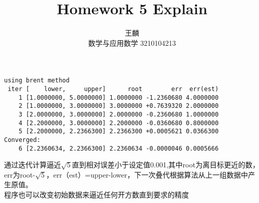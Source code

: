 \documentclass{ctexart}
\title{Homework 5 Explain}
\author{王麟 \\ 数学与应用数学 3210104213}
\begin{document}
\maketitle

\begin{verbatim}
using brent method
 iter [    lower,     upper]      root        err  err(est)
    1 [1.0000000, 5.0000000] 1.0000000 -1.2360680 4.0000000
    2 [1.0000000, 3.0000000] 3.0000000 +0.7639320 2.0000000
    3 [2.0000000, 3.0000000] 2.0000000 -0.2360680 1.0000000
    4 [2.2000000, 3.0000000] 2.2000000 -0.0360680 0.8000000
    5 [2.2000000, 2.2366300] 2.2366300 +0.0005621 0.0366300
Converged:
    6 [2.2360634, 2.2366300] 2.2360634 -0.0000046 0.0005666
\end{verbatim}

通过迭代计算逼近$\sqrt{5}$直到相对误差小于设定值0.001,其中root为离目标更近的数，err为root-$\sqrt{5}$，err（est）=upper-lower，下一次叠代根据算法从上一组数据中产生原值。\\
程序也可以改变初始数据来逼近任何开方数直到要求的精度
\end{document}

